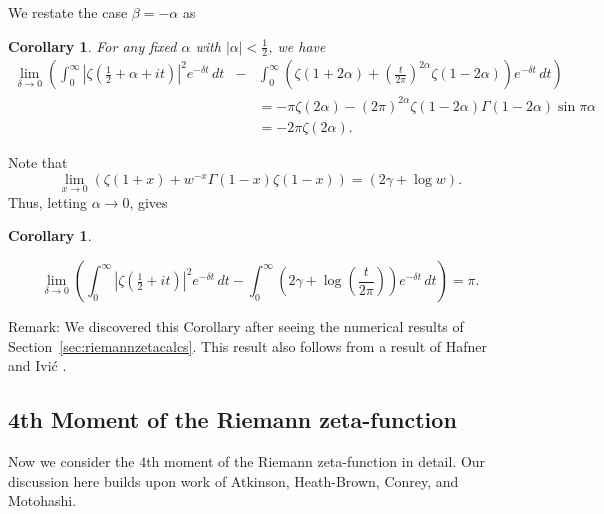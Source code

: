 \documentclass[12pt,letterpaper]{amsart}
\theoremstyle{plain}
\newtheorem{corollary}[theorem]{Corollary}
\theoremstyle{definition}
\theoremstyle{remark}
\numberwithin{equation}{subsection}
\numberwithin{theorem}{subsection}
\numberwithin{table}{subsection}
\begin{document}
We restate the case $\beta=-\alpha$ as
\begin{corollary}
 For any fixed $\alpha$ with $|\alpha|< \frac12 $, we have
\begin{eqnarray}
\lim_{\delta\to 0}\left(\int_0^\infty |\zeta(\tfrac 12
+\alpha+it)|^2 e^{-\delta t} \,dt\right.
&-&\int_0^\infty
\left.\left(\zeta(1+2\alpha)+\left(\frac t{2\pi}\right)^{2\alpha}
\zeta(1-2\alpha)\right)e^{-\delta t}\,dt\right)\nonumber \\
&   & =-\pi \zeta(2\alpha)-(2\pi)^{2\alpha}\zeta(1-2\alpha)\Gamma(1-2\alpha)
\sin \pi \alpha \nonumber\\
&   & =-2\pi\zeta(2\alpha)  .
\end{eqnarray}
\end{corollary}



Note that
\begin{equation}\lim_{x\to 0}
(\zeta(1+x)+w^{-x}\Gamma(1-x)\zeta(1-x))=(2\gamma+\log w) .
\end{equation}
 Thus,  letting $\alpha \to 0$, gives
\begin{corollary} \label{thm:pimoment}

\begin{equation}
\lim_{\delta\to 0}\left( \int_0^\infty |\zeta(\tfrac 12  +it)|^2
e^{-\delta t} \,dt - \int_0^\infty
\left(2\gamma+\log\left(\frac{t}{2\pi}\right)\right)e^{-\delta t}
\,dt\right)=\pi .\end{equation}
\end{corollary}


Remark:  We discovered this Corollary after seeing the numerical
results of Section~\ref{sec:riemannzetacalcs}.  This result also follows from a result of
Hafner and Ivi\'c \cite{HI}.


\subsection{  4th Moment of the Riemann zeta-function
}\label{sec:fourthmoment}



Now we consider the 4th moment of the Riemann zeta-function in
detail.  Our discussion here builds upon work of Atkinson\cite{A},
Heath-Brown\cite{H-B1}, Conrey\cite{C}, and Motohashi\cite{Mot}.
\end{document}
